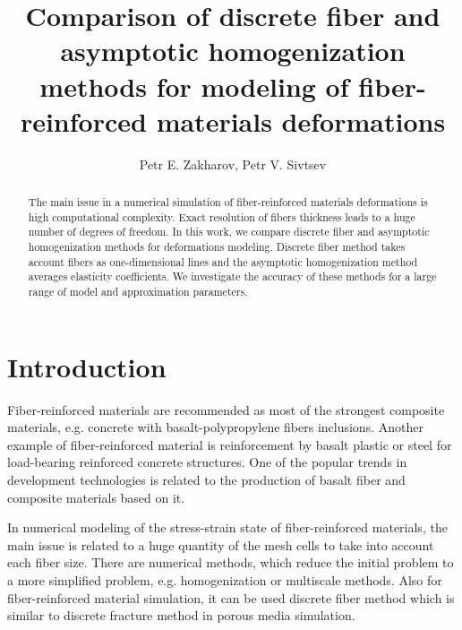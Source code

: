 \documentclass[a4paper]{jpconf}
\begin{document}
 

\title{Comparison of discrete fiber and asymptotic homogenization methods for modeling of fiber-reinforced materials deformations}
\author{Petr E. Zakharov, Petr V. Sivtsev}
\address{Ammosov North-Eastern Federal University, 58, Belinskogo, 677000 Yakutsk, Russia}




\begin{abstract}
 
The main issue in a numerical simulation of fiber-reinforced materials deformations is high computational complexity.
Exact resolution of fibers thickness leads to a huge number of degrees of freedom. In this work, we compare discrete fiber and asymptotic homogenization methods for deformations modeling.
Discrete fiber method takes account fibers as one-dimensional lines and the asymptotic homogenization method averages elasticity coefficients.
We investigate the accuracy of these methods for a large range of model and approximation parameters.
\end{abstract}


\section{Introduction}

Fiber-reinforced materials are recommended as most of the strongest composite materials, e.g. concrete with basalt-polypropylene fibers inclusions\cite{smarzewski2019influence}.
Another example of fiber-reinforced material is reinforcement by basalt plastic or steel for load-bearing reinforced concrete structures\cite{savspv2018,Kolesov}.
One of the popular trends in development technologies is related to the production of basalt fiber and composite materials based on it.

In numerical modeling of the stress-strain state of fiber-reinforced materials, the main issue is related to a huge quantity of the mesh cells to take into account each fiber size.
There are numerical methods, which reduce the initial problem to a more simplified problem, e.g. homogenization or multiscale methods\cite{Zakharov, stepanov2018generalized}. Also for fiber-reinforced material simulation, it can be used discrete fiber method which is similar to discrete fracture method\cite{DFM, DFM2} in porous media simulation.
\end{document}
